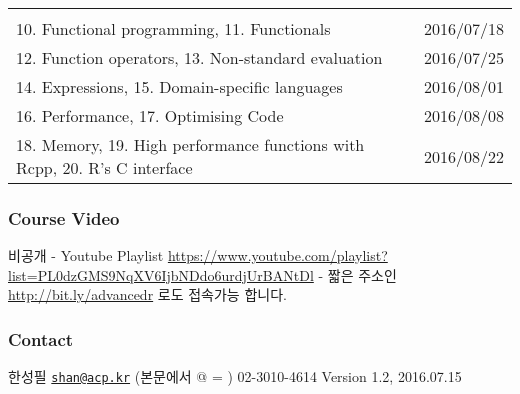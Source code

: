 \documentclass[]{article}
\begin{document}
\begin{longtable}[]{@{}ll@{}}
\begin{minipage}[t]{0.04\columnwidth}
\end{minipage}\tabularnewline
\begin{minipage}[t]{0.73\columnwidth}\raggedright\strut
10. Functional programming, 11. Functionals\strut
\end{minipage} & \begin{minipage}[t]{0.04\columnwidth}\raggedright\strut
2016/07/18\strut
\end{minipage}\tabularnewline
\begin{minipage}[t]{0.73\columnwidth}\raggedright\strut
12. Function operators, 13. Non-standard evaluation\strut
\end{minipage} & \begin{minipage}[t]{0.04\columnwidth}\raggedright\strut
2016/07/25\strut
\end{minipage}\tabularnewline
\begin{minipage}[t]{0.73\columnwidth}\raggedright\strut
14. Expressions, 15. Domain-specific languages\strut
\end{minipage} & \begin{minipage}[t]{0.04\columnwidth}\raggedright\strut
2016/08/01\strut
\end{minipage}\tabularnewline
\begin{minipage}[t]{0.73\columnwidth}\raggedright\strut
16. Performance, 17. Optimising Code\strut
\end{minipage} & \begin{minipage}[t]{0.04\columnwidth}\raggedright\strut
2016/08/08\strut
\end{minipage}\tabularnewline
\begin{minipage}[t]{0.73\columnwidth}\raggedright\strut
18. Memory, 19. High performance functions with Rcpp, 20. R's C
interface\strut
\end{minipage} & \begin{minipage}[t]{0.04\columnwidth}\raggedright\strut
2016/08/22\strut
\end{minipage}\tabularnewline
\bottomrule
\end{longtable}

\subsubsection{Course Video}\label{course-video}

비공개 - Youtube Playlist
\url{https://www.youtube.com/playlist?list=PL0dzGMS9NqXV6IjbNDdo6urdjUrBANtDl}
- 짧은 주소인 \url{http://bit.ly/advancedr} 로도 접속가능 합니다.

\subsubsection{Contact}\label{contact}

한성필 \textbar{} \href{mailto:shan@acp.kr}{\nolinkurl{shan@acp.kr}}
(본문에서 @ = \citet{acp.kr}) \textbar{} 02-3010-4614 Version 1.2,
2016.07.15
\end{document}
